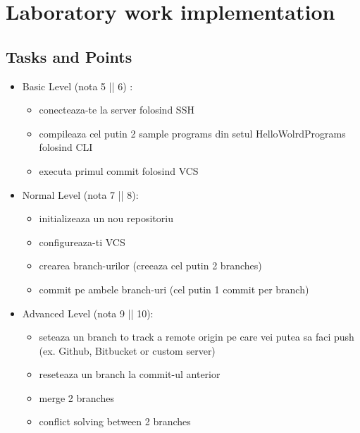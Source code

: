 \section{Laboratory work implementation}

\subsection{Tasks and Points}

\begin{itemize}
	\item Basic Level (nota 5 || 6) :
	\begin{itemize}
		\item conecteaza-te la server folosind SSH
		\item compileaza cel putin 2 sample programs din setul HelloWolrdPrograms folosind CLI
		\item executa primul commit folosind VCS
	\end{itemize}
	\item Normal Level (nota 7 || 8):
	\begin{itemize}
		\item initializeaza un nou repositoriu
		\item configureaza-ti VCS
		\item crearea branch-urilor (creeaza cel putin 2 branches)
		\item commit pe ambele branch-uri (cel putin 1 commit per branch)
	\end{itemize}
	\item Advanced Level (nota 9 || 10):
	\begin{itemize}
		\item seteaza un branch to track a remote origin pe care vei putea sa faci push (ex. Github, Bitbucket or custom server)
		\item reseteaza un branch la commit-ul anterior
		\item merge 2 branches
	\item conflict solving between 2 branches
	\end{itemize}
	\end{itemize}

